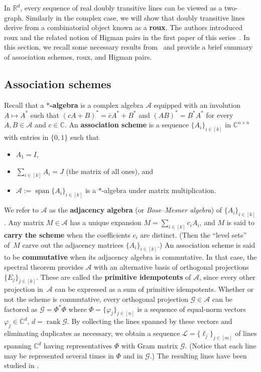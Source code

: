 \documentclass[11pt]{article}
\theoremstyle{definition}
\numberwithin{equation}{section}
\begin{document}
In $\mathbb{R}^d$, every sequence of real doubly transitive lines can be viewed as a two-graph.
Similarly in the complex case, we will show that doubly transitive lines derive from a combinatorial object known as a \textbf{roux}.
The authors introduced roux and the related notion of Higman pairs in the first paper of this series~\cite{IversonM:18}.
In this section, we recall some necessary results from~\cite{IversonM:18} and provide a brief summary of association schemes, roux, and Higman pairs.

\subsection{Association schemes}

Recall that a \textbf{$*$-algebra} is a complex algebra $\mathscr{A}$ equipped with an involution $A \mapsto A^*$ such that $(cA+B)^* =\overline{c}A^* + B^*$ and $(AB)^* = B^* A^*$ for every $A,B \in \mathscr{A}$ and $c \in \mathbb{C}$.
An \textbf{association scheme} is a sequence $\{A_i\}_{i\in[k]}$ in $\mathbb{C}^{n\times n}$ with entries in $\{0,1\}$ such that
\begin{itemize}
\item[(A1)]
$A_1=I$,
\item[(A2)]
$\sum_{i\in[k]}A_i=J$ (the matrix of all ones), and
\item[(A3)]
$\mathscr{A}:=\operatorname{span}\{A_i\}_{i\in[k]}$ is a $*$-algebra under matrix multiplication.
\end{itemize}
We refer to $\mathscr{A}$ as the \textbf{adjacency algebra} (or \textit{Bose--Mesner algebra}) of $\{ A_i \}_{i \in [k]}$.
Any matrix $M \in \mathscr{A}$ has a unique expansion $M = \sum_{i \in [k]} c_i A_i$, and $M$ is said to \textbf{carry the scheme} when the coefficients $c_i$ are distinct.
(Then the ``level sets'' of~$M$ carve out the adjacency matrices $\{A_i\}_{i\in [k]}$.)
An association scheme is said to be \textbf{commutative} when its adjacency algebra is commutative.
In that case, the spectral theorem provides $\mathscr{A}$ with an alternative basis of orthogonal projections $\{ E_j \}_{j\in [k]}$.
These are called the \textbf{primitive idempotents} of $\mathscr{A}$, since every other projection in~$\mathscr{A}$ can be expressed as a sum of primitive idempotents.
Whether or not the scheme is commutative, every orthogonal projection $\mathcal{G} \in \mathscr{A}$ can be factored as $\mathcal{G} = \Phi^* \Phi$ where $\Phi = \{ \varphi_j \}_{j\in [n]}$ is a sequence of equal-norm vectors $ \varphi_j \in \mathbb{C}^d$, $d = \operatorname{rank} \mathcal{G}$.
By collecting the lines spanned by these vectors and eliminating duplicates as necessary, we obtain a sequence $\mathscr{L} = \{ \ell_j \}_{j\in [m]}$ of lines spanning $\mathbb{C}^d$ having representatives $\Phi$ with Gram matrix $\mathcal{G}$.
(Notice that each line may be represented several times in $\Phi$ and in $\mathcal{G}$.)
The resulting lines have been studied in \cite{DelsarteGS:77,IversonJM:19,IversonJM:SPIE:17,IversonJM:17}.
\end{document}
